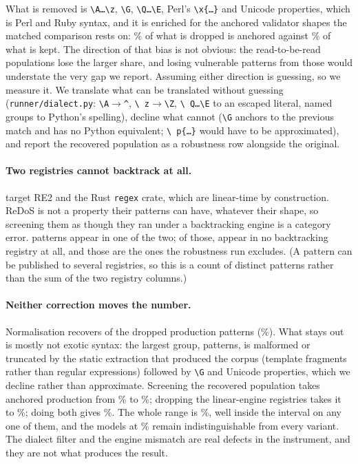 \documentclass[11pt]{article}
\begin{document}
What is removed is \texttt{\textbackslash A\ldots\textbackslash z},
\texttt{\textbackslash G}, \texttt{\textbackslash Q\ldots\textbackslash E},
Perl's \texttt{\textbackslash x\{\ldots\}} and Unicode properties, which is Perl and
Ruby syntax, and it is enriched for the anchored validator shapes the matched
comparison rests on: \dropanchoredpct{}\% of what is dropped is anchored
against \keptanchoredpct{}\% of what is kept. The direction of that bias is
not obvious: the read-to-be-read populations lose the larger share, and
losing vulnerable patterns from those would understate the very gap we report.
Assuming either direction is guessing, so we measure it. We translate what
can be translated without guessing (\texttt{runner/dialect.py}:
\texttt{\textbackslash A}$\to$\texttt{\^{}}, \texttt{\textbackslash
z}$\to$\texttt{\textbackslash Z}, \texttt{\textbackslash
Q\ldots\textbackslash E} to an escaped literal, named groups to Python's
spelling), decline what cannot (\texttt{\textbackslash G} anchors to the
previous match and has no Python equivalent; \texttt{\textbackslash
p\{\ldots\}} would have to be approximated), and report the recovered
population as a robustness row alongside the original.

\paragraph{Two registries cannot backtrack at all.} \linearregistries{} target
RE2 and the Rust \texttt{regex} crate, which are linear-time by construction.
ReDoS is not a property their patterns can have, whatever their shape, so
screening them as though they ran under a backtracking engine is a category
error. \linearpatterns{} patterns appear in one of the two; of those,
\linearonly{} appear in no backtracking registry at all, and those are the
ones the robustness run excludes. (A pattern can be published to several
registries, so this is a count of distinct patterns rather than the sum of the
two registry columns.)

\paragraph{Neither correction moves the number.} Normalisation recovers
\recovered{} of the \proddropped{} dropped production patterns
(\recoveredpct{}\%). What stays out is mostly not exotic syntax: the largest
group, \topunrecoveredn{} patterns, is malformed or truncated by the static
extraction that produced the corpus (template fragments rather than
regular expressions) followed by \texttt{\textbackslash G} and Unicode
properties, which we decline rather than approximate. Screening the recovered
population takes anchored
production from \anchoredprod{}\% to \robnorm{}\%; dropping the linear-engine
registries takes it to \robbt{}\%; doing both gives \robboth{}\%. The whole
range is \robrange{}\%, well inside the interval on any one of them, and the
models at \anchoredmodels{}\% remain indistinguishable from every variant.
The dialect filter and the engine mismatch are real defects in the
instrument, and they are not what produces the result.
\end{document}
